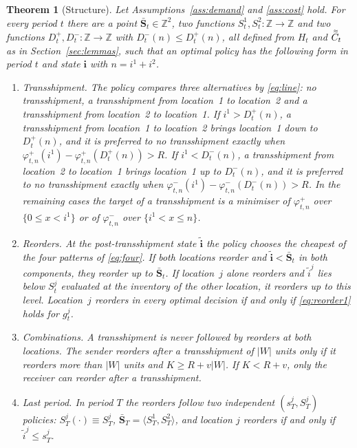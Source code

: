 \documentclass[11pt]{article}
\DeclareRobustCommand{\dbtilde}[1]{\accentset{\approx}{#1}}
\renewcommand{\vec}[1]{\boldsymbol{#1}}
\newcommand{\Z}{\mathbb{Z}}
\newcommand{\Cq}{\dbtilde{C}}
\newtheorem{theorem}{Theorem}
\theoremstyle{definition}
\begin{document}
\begin{theorem}[Structure]\label{thm:structure}
Let Assumptions~\ref{ass:demand} and \ref{ass:cost} hold. For every period $t$ there are a point $\bar{\vec{S}}_t\in\Z^2$, two functions $S^1_t,S^2_t:\Z\to\Z$ and two functions $D^+_t,D^-_t:\Z\to\Z$ with $D^-_t(n)\le D^+_t(n)$, all defined from $H_t$ and $\Cq_t$ as in Section~\ref{sec:lemmas}, such that an optimal policy has the following form in period $t$ and state $\vec{i}$ with $n=i^1+i^2$.
\begin{enumerate}[label=(\alph*)]
\item \emph{Transshipment.} The policy compares three alternatives by \eqref{eq:line}: no transshipment, a transshipment from location~1 to location~2 and a transshipment from location~2 to location~1. If $i^1>D^+_t(n)$, a transshipment from location~1 to location~2 brings location~1 down to $D^+_t(n)$, and it is preferred to no transshipment exactly when $\varphi^+_{t,n}(i^1)-\varphi^+_{t,n}(D^+_t(n))>R$. If $i^1<D^-_t(n)$, a transshipment from location~2 to location~1 brings location~1 up to $D^-_t(n)$, and it is preferred to no transshipment exactly when $\varphi^-_{t,n}(i^1)-\varphi^-_{t,n}(D^-_t(n))>R$. In the remaining cases the target of a transshipment is a minimiser of $\varphi^+_{t,n}$ over $\{0\le x<i^1\}$ or of $\varphi^-_{t,n}$ over $\{i^1<x\le n\}$.
\item \emph{Reorders.} At the post-transshipment state $\tilde{\vec{i}}$ the policy chooses the cheapest of the four patterns of \eqref{eq:four}. If both locations reorder and $\tilde{\vec{i}}<\bar{\vec{S}}_t$ in both components, they reorder up to $\bar{\vec{S}}_t$. If location~$j$ alone reorders and $\tilde{i}^j$ lies below $S^j_t$ evaluated at the inventory of the other location, it reorders up to this level. Location~$j$ reorders in every optimal decision if and only if \eqref{eq:reorder1} holds for $g^j_t$.
\item \emph{Combinations.} A transshipment is never followed by reorders at both locations. The sender reorders after a transshipment of $|W|$ units only if it reorders more than $|W|$ units and $K\ge R+v|W|$. If $K<R+v$, only the receiver can reorder after a transshipment.
\item \emph{Last period.} In period $T$ the reorders follow two independent $(s^j_T,S^j_T)$ policies: $S^j_T(\cdot)\equiv S^j_T$, $\bar{\vec{S}}_T=\langle S^1_T,S^2_T\rangle$, and location $j$ reorders if and only if $\tilde{i}^j\le s^j_T$.
\end{enumerate}
\end{theorem}
\end{document}
